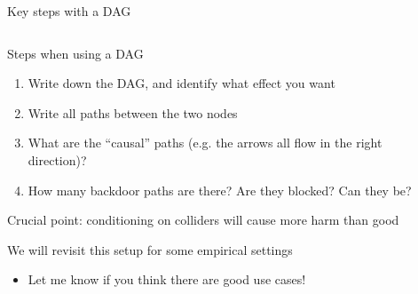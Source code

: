 \documentclass[notes,11pt, aspectratio=169]{beamer}
\newenvironment{wideitemize}{\itemize\addtolength{\itemsep}{10pt}}{\enditemize}
\begin{document}
\begin{frame}{Key steps with a DAG}
\begin{columns}[T] %
  \begin{column}{.7\textwidth}
    \begin{wideitemize}
    \item Steps when using a DAG
      \begin{enumerate}
      \item Write down the DAG, and identify what effect you want
      \item Write all paths between the two nodes
      \item What are the ``causal'' paths (e.g. the arrows all flow in the right direction)?
      \item How many backdoor paths are there? Are they blocked? Can they be?
      \end{enumerate}
    \item Crucial point: conditioning on colliders will cause more harm than good
    \item We will revisit this setup for some empirical settings
      \begin{itemize}
      \item Let me know if you think there are good use cases!
      \end{itemize}
    \end{wideitemize}
  \end{column}%
  \hfill%
  \begin{column}{.5\textwidth}
  \end{column}
\end{columns}
\end{frame}
\end{document}
